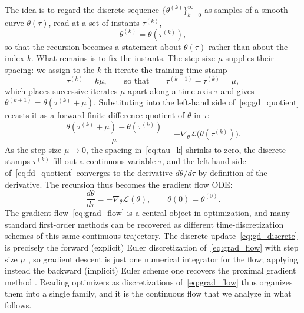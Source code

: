 The idea is to regard the discrete sequence $\{\theta^{(k)}\}_{k=0}^{\infty}$ as samples of a smooth curve $\theta(\tau)$, read at a set of instants $\tau^{(k)}$,
\begin{equation*}
    \theta^{(k)} = \theta(\tau^{(k)}),
\end{equation*}
so that the recursion becomes a statement about $\theta(\tau)$ rather than about the index $k$. What remains is to fix the instants. The step size $\mu$ supplies their spacing: we assign to the $k$-th iterate the training-time stamp
\begin{equation}\label{eq:tau_k}
    \tau^{(k)} = k\mu, \qquad \text{so that} \qquad \tau^{(k+1)} - \tau^{(k)} = \mu,
\end{equation}
which places successive iterates $\mu$ apart along a time axis $\tau$ and gives $\theta^{(k+1)} = \theta(\tau^{(k)} + \mu)$. Substituting into the left-hand side of~\eqref{eq:gd_quotient} recasts it as a forward finite-difference quotient of $\theta$ in $\tau$:
\begin{equation}\label{eq:fd_quotient}
    \frac{\theta(\tau^{(k)} + \mu) - \theta(\tau^{(k)})}{\mu} = -\nabla_\theta\mathcal{L}\bigl(\theta(\tau^{(k)})\bigr).
\end{equation}
As the step size $\mu \to 0$, the spacing in~\eqref{eq:tau_k} shrinks to zero, the discrete stamps $\tau^{(k)}$ fill out a continuous variable $\tau$, and the left-hand side of~\eqref{eq:fd_quotient} converges to the derivative $d\theta/d\tau$ by definition of the derivative. The recursion thus becomes the gradient flow ODE:
\begin{equation}\label{eq:grad_flow}
    \frac{d\theta}{d\tau} = -\nabla_\theta \mathcal{L}(\theta), \qquad \theta(0) = \theta^{(0)}.
\end{equation}
The gradient flow~\eqref{eq:grad_flow} is a central object in optimization, and many standard first-order methods can be recovered as different time-discretization schemes of this same continuous trajectory. The discrete update~\eqref{eq:gd_discrete} is precisely the forward (explicit) Euler discretization of~\eqref{eq:grad_flow} with step size $\mu$ \parencite{suli2003, burden2011}, so gradient descent is just one numerical integrator for the flow; applying instead the backward (implicit) Euler scheme \parencite{suli2003} one recovers the proximal gradient method \parencite{parikh2013}. Reading optimizers as discretizations of~\eqref{eq:grad_flow} thus organizes them into a single family, and it is the continuous flow that we analyze in what follows.

